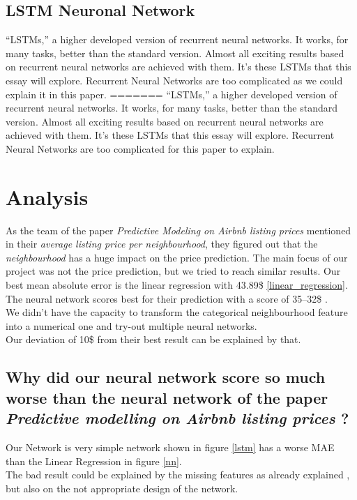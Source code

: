 \documentclass[journal]{IEEEtran}
\begin{document}
\subsection{LSTM Neuronal Network}
\noindent “LSTMs,” a higher developed version of recurrent neural networks. It works, for many tasks, better than the standard version. Almost all exciting results based on recurrent neural networks are achieved with them. It’s these LSTMs that this essay will explore. Recurrent Neural Networks are too complicated as we could explain it in this paper. 
=======
“LSTMs,” a higher developed version of recurrent neural networks. It works, for many tasks, better than the standard version. Almost all exciting results based on recurrent neural networks are achieved with them. It’s these LSTMs that this essay will explore. Recurrent Neural Networks are too complicated for this paper to explain. 

\section{Analysis}

As the team of the paper \textit{Predictive Modeling on Airbnb listing prices} \cite{RN1} mentioned in their \textit{average listing price per neighbourhood}, they figured out that the \textit{neighbourhood} has a huge impact on the price prediction. The main focus of our project was not the price prediction, but we tried to reach similar results. Our best mean absolute error is the linear regression with 43.89\$ \ref{linear_regression}. The neural network scores best for their prediction with a score of 35–32\$ \cite{RN1}. \\
We didn't have the capacity to transform the categorical neighbourhood feature into a numerical one and try-out multiple neural networks. \\
Our deviation of 10\$ from their best result can be explained by that.

\subsection{Why did our neural network score so much worse than the neural network of the paper \textit{Predictive modelling on Airbnb listing prices} \cite{RN1}?}

Our Network is very simple network shown in figure \ref{lstm} has a worse MAE than the Linear Regression in figure \ref{nn}. \\
The bad result could be explained by the missing features as already explained \cite{RN1}, but also on the not appropriate design of the network.
\end{document}
